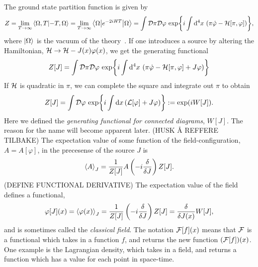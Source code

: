 The ground state partition function is given by
\begin{equation}
    Z = \lim_{T\rightarrow \infty} \braket{\Omega, T}{-T, \Omega}
    = \lim_{T\rightarrow \infty} \left\langle \Omega {\left|  e^{-2iHT}  \right|} \Omega \right\rangle
    = \int \mathcal{D} \pi \mathcal{D} \varphi \, \exp{ i \int \dd^4 x \, \left(\pi \dot \varphi - \mathcal{H}[\pi, \varphi]\right) },
\end{equation}
where $\ket{\Omega}$ is the vacuum of the theory~\cite{Peskin:IntroQFT,weinberg_1995}.
If one introduces a source by altering the Hamiltonian, $\mathcal{H} \rightarrow \mathcal{H} - J(x)\varphi(x)$, we get the generating functional
\begin{equation}
    Z[J] = 
    \int \mathcal{D} \pi \mathcal{D} \varphi \, 
    \exp{ i \int \dd^4 x \, \left(\pi \dot \varphi - \mathcal{H}[\pi, \varphi]+ J\varphi\right) }
\end{equation}
If $\mathcal{H}$ is quadratic in $\pi$, we can complete the square and integrate out $\pi$ to obtain
\begin{equation}
    Z[J] = \int \mathcal{D} \varphi \, \exp{i \int \dd x\, (\mathcal{L}[\varphi] + J \varphi)}
    := \exp(i W[J]).
\end{equation}
Here we defined the \emph{generating functional for connected diagrams}, $W[J]$.
The reason for the name will become apparent later. (HUSK Å REFFERE TILBAKE)
The expectation value of some function of the field-configuration, $A = A[\varphi]$, in the precesense of the source $J$ is
\begin{equation}
    \ex{A}_J = \frac{1}{Z[J]} A\left( -i  \fdv{J}\right) Z[J].
\end{equation}
(DEFINE FUNCTIONAL DERIVATIVE)
The expectation value of the field defines a functional,
\begin{equation}
    \label{calssical field functional}
    \varphi[J](x) = \ex{\varphi(x)}_J = 
    \frac{1}{Z[J]} \left( -i  \fdv{J}\right) Z[J]
    = \fdv{J(x)} W[J],
\end{equation}
and is sometimes called the \emph{classical field}.
The notation $\mathcal{F}[f](x)$ means that $\mathcal{F}$ is a functional which takes in a function $f$, and returns the new function $(\mathcal{F}[f])(x)$.
One example is the Lagrangian density, which takes in a field, and returns a function which has a value for each point in space-time.

